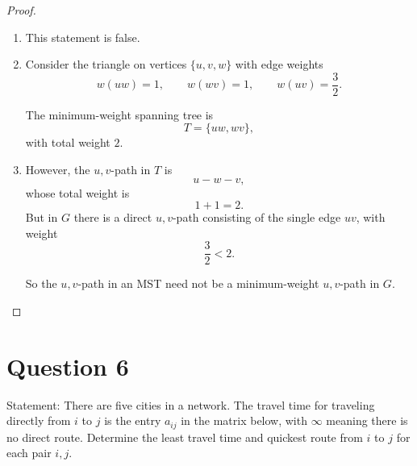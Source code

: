 \documentclass[11pt]{article}
\begin{document}
\begin{proof}
~
\begin{enumerate}
    \item This statement is false.

\item Consider the triangle on vertices $\{u,v,w\}$ with edge weights
\[
w(uw)=1,\qquad w(wv)=1,\qquad w(uv)=\frac32.
\]

The minimum-weight spanning tree is
\[
T=\{uw,wv\},
\]
with total weight $2$.

\item However, the $u,v$-path in $T$ is
\[
u-w-v,
\]
whose total weight is
\[
1+1=2.
\]
But in $G$ there is a direct $u,v$-path consisting of the single edge $uv$, with weight
\[
\frac32<2.
\]

So the $u,v$-path in an MST need not be a minimum-weight $u,v$-path in $G$.
\end{enumerate}
\end{proof}

\newpage

\section*{Question 6}

Statement: {There are five cities in a network. The travel time for traveling directly from $i$ to $j$ is the entry $a_{ij}$ in the matrix below, with $\infty$ meaning there is no direct route. Determine the least travel time and quickest route from $i$ to $j$ for each pair $i,j$.}
\end{document}
